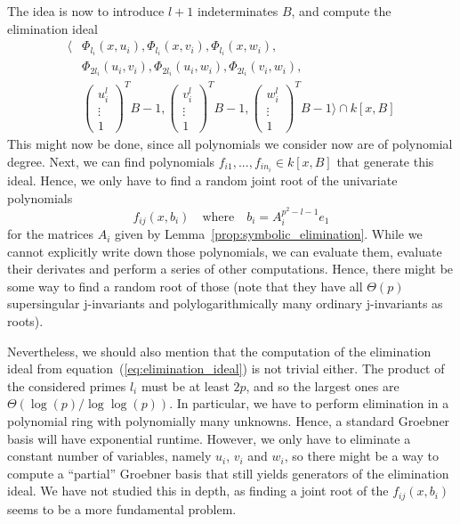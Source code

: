 The idea is now to introduce $l + 1$ indeterminates $B$, and compute the elimination ideal
\begin{equation}
\label{eq:elimination_ideal}
\begin{split}
    \langle &\Phi_{l_i}(x, u_i), \Phi_{l_i}(x, v_i), \Phi_{l_i}(x, w_i), \\
    &\Phi_{2l_i}(u_i, v_i), \Phi_{2l_i}(u_i, w_i), \Phi_{2l_i}(v_i, w_i), \\
    &\left(\begin{matrix*}
        u_i^l \\
        \vdots \\
        1
    \end{matrix*}\right)^T B - 1, \left(\begin{matrix*}
        v_i^l \\
        \vdots \\
        1
    \end{matrix*}\right)^T B - 1, \left(\begin{matrix*}
        w_i^l \\
        \vdots \\
        1
    \end{matrix*}\right)^T B - 1 \rangle \cap k[x, B]
\end{split}
\end{equation}
This might now be done, since all polynomials we consider now are of polynomial degree.
Next, we can find polynomials $f_{i1}, ..., f_{in_i} \in k[x, B]$ that generate this ideal.
Hence, we only have to find a random joint root of the univariate polynomials
\begin{equation*}
    f_{i j}(x, b_i) \quad \text{where} \quad b_i = A_i^{p^2 - l - 1} e_1
\end{equation*}
for the matrices $A_i$ given by Lemma~\ref{prop:symbolic_elimination}.
While we cannot explicitly write down those polynomials, we can evaluate them, evaluate their derivates and perform a series of other computations.
Hence, there might be some way to find a random root of those (note that they have all $\Theta(p)$ supersingular j-invariants and polylogarithmically many ordinary j-invariants as roots).

Nevertheless, we should also mention that the computation of the elimination ideal from equation~(\ref{eq:elimination_ideal}) is not trivial either.
The product of the considered primes $l_i$ must be at least $2p$, and so the largest ones are $\Theta(\log(p)/\log\log(p))$.
In particular, we have to perform elimination in a polynomial ring with polynomially many unknowns.
Hence, a standard Groebner basis will have exponential runtime.
However, we only have to eliminate a constant number of variables, namely $u_i$, $v_i$ and $w_i$, so there might be a way to compute a ``partial'' Groebner basis that still yields generators of the elimination ideal.
We have not studied this in depth, as finding a joint root of the $f_{ij}(x, b_i)$ seems to be a more fundamental problem.

